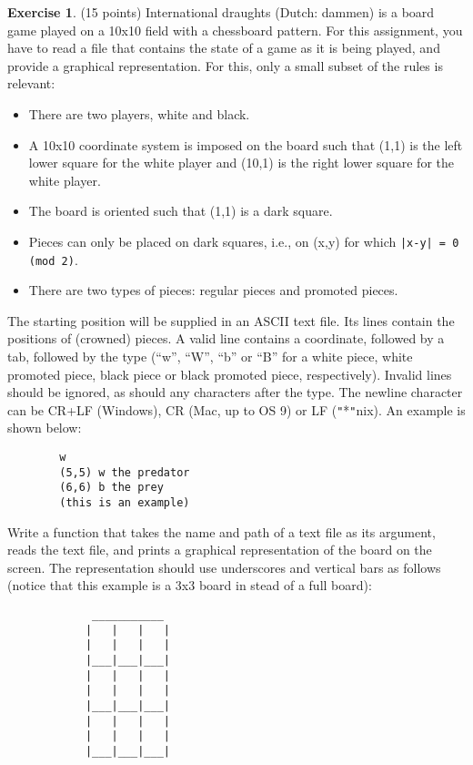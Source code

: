 \documentclass[a4paper]{report}
\theoremstyle{definition}
\newtheorem{exercise}{Exercise}
\newcommand{\doublequote}{\texttt{"}}
\begin{document}
	\begin{exercise}
		(15 points) International draughts (Dutch: dammen) is a board game played on a 10x10 field with a chessboard pattern. For this assignment, you have to	read a file that contains the state of a game as it is being played, and provide a graphical representation. For this, only a small subset of the rules is relevant:
		\begin{itemize}
			\setlength\itemsep{1mm}
			\item There are two players, white and black.
			\item A 10x10 coordinate system is imposed on the board such that (1,1)	is the left lower square for the white player and (10,1) is the	right lower square for the white player.
			\item The board is oriented such that (1,1) is a dark square.
			\item Pieces can only be placed on dark squares, i.e., on (x,y) for which \texttt{|x-y| = 0 (mod 2)}.
			\item There are two types of pieces: regular pieces and promoted pieces.
		\end{itemize}
		
		\noindent The starting position will be supplied in an ASCII text file.  Its lines contain the positions of (crowned) pieces. A valid line contains a coordinate, followed by a tab, followed by the type (“w”, “W”, “b” or “B” for a white piece, white promoted piece, black piece or black promoted piece, respectively). Invalid lines should be ignored, as should any characters after the type. The newline character can be 	CR+LF (Windows), CR (Mac, up to OS 9) or LF (\doublequote{}*\doublequote{}nix). An example is	shown below:
		\begin{verbatim}
		w
		(5,5) w the predator
		(6,6) b the prey
		(this is an example)
		\end{verbatim}
		
		Write a function that takes the name and path of a text file as	its argument, reads the text file, and prints a graphical representation of the board on the screen. The representation should use underscores and vertical bars as follows (notice that this example is a 3x3 board in stead of a full board):
		
		\begin{verbatim}
			 ___________
			|   |   |   |
			|   |   |   |
			|___|___|___|
			|   |   |   |
			|   |   |   |
			|___|___|___|
			|   |   |   |
			|   |   |   |
			|___|___|___|
			

\end{verbatim}
\end{exercise}
\end{document}
